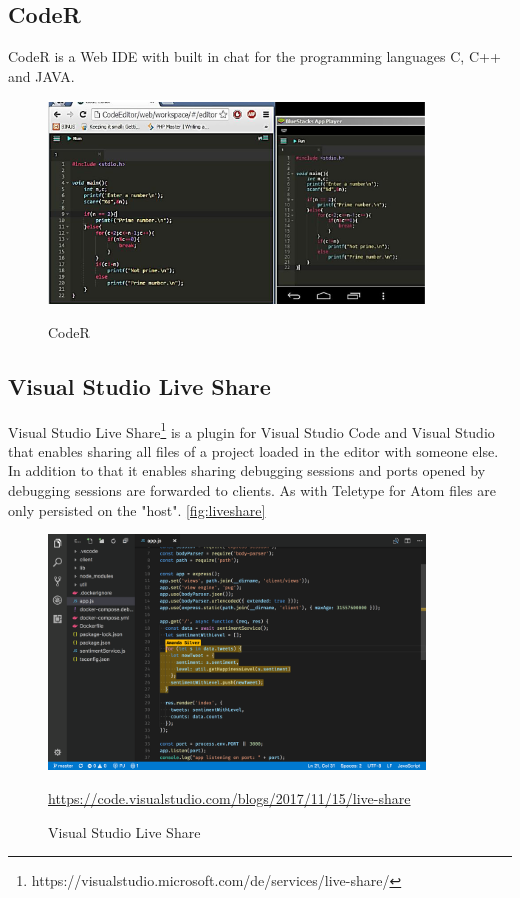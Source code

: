 \subsection{CodeR}
CodeR\cite{KurniawanSoesantoWijaya:2015:CodeR:Real-timeCodeEditorApplicationforCollaborativeProgramming} is a Web IDE with built in chat for the programming languages C, C++ and JAVA. 
\begin{figure}[hb]
    \centering
    \includegraphics[width=100mm]{figures/screenshots/CodeR.png}
	\caption{CodeR }
	\cite{KurniawanSoesantoWijaya:2015:CodeR:Real-timeCodeEditorApplicationforCollaborativeProgramming}
    \label{fig:touchdevelop}
\end{figure}
\subsection{Visual Studio Live Share}
Visual Studio Live Share\footnote{https://visualstudio.microsoft.com/de/services/live-share/}  is a plugin for Visual Studio Code and Visual Studio that enables sharing all files of a project loaded in the editor with someone else. In addition to that it enables sharing debugging sessions and ports opened by debugging sessions are forwarded to clients. As with Teletype for Atom files are only persisted on the "host". \autoref{fig:liveshare}
\begin{figure}[hb]
    \centering
    \includegraphics[width=100mm]{figures/screenshots/vscodeliveshare.png}
	\caption{Visual Studio Live Share}
	\href{https://code.visualstudio.com/blogs/2017/11/15/live-share}{https://code.visualstudio.com/blogs/2017/11/15/live-share}
    \label{fig:liveshare}
\end{figure}
